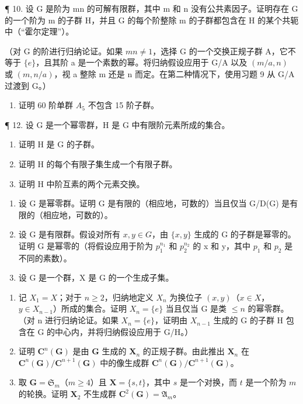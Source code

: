 ¶ 10. 设 G 是阶为 mn 的可解有限群，其中 m 和 n 没有公共素因子。证明存在 G 的一个阶为 m 的子群 H，并且 G 的每个阶整除 m 的子群都包含在 H 的某个共轭中（“霍尔定理”）。

（对 G 的阶进行归纳论证。如果 \(mn \neq 1\)，选择 G 的一个交换正规子群 A，它不等于 \(\{e\}\)，且其阶 a 是一个素数的幂。将归纳假设应用于 G/A 以及 \((m/a, n)\) 或 \((m, n/a)\)，视 a 整除 m 还是 n 而定。在第二种情况下，使用习题 9 从 G/A 过渡到 G。）

\begin{enumerate}
\def\labelenumi{\arabic{enumi}。}
\setcounter{enumi}{10}
\tightlist
\item
  证明 60 阶单群 \(A_{5}\) 不包含 15 阶子群。
\end{enumerate}

¶ 12. 设 G 是一个幂零群，H 是 G 中有限阶元素所成的集合。

\begin{enumerate}
\def\labelenumi{(\alph{enumi})}
\item
  证明 H 是 G 的子群。
\item
  证明 H 的每个有限子集生成一个有限子群。
\item
  证明 H 中阶互素的两个元素交换。
\end{enumerate}

\begin{enumerate}
\def\labelenumi{\arabic{enumi}。}
\setcounter{enumi}{12}
\item
  设 G 是幂零群。证明 G 是有限的（相应地，可数的）当且仅当 G/D(G) 是有限的（相应地，可数的）。
\item
  设 G 是有限群。假设对所有 \(x, y \in G\)，由 \(\{x, y\}\) 生成的 G 的子群是幂零的。证明 G 是幂零的（将假设应用于阶为 \(p_{1}^{n_{1}}\) 和 \(p_{2}^{n_{2}}\) 的 x 和 y，其中 \(p_{1}\) 和 \(p_{2}\) 是不同的素数）。
\item
  设 G 是一个群，X 是 G 的一个生成子集。
\end{enumerate}

\begin{enumerate}
\def\labelenumi{(\alph{enumi})}
\item
  记 \(X_{1} = X\)；对于 \(n \geqslant 2\)，归纳地定义 \(X_{n}\) 为换位子 \((x, y)\)（\(x \in X\)，\(y \in X_{n-1}\)）所成的集合。证明 \(X_{n} = \{e\}\) 当且仅当 G 是类 \(\leqslant n\) 的幂零群。（对 n 进行归纳论证。如果 \(X_{n} = \{e\}\)，证明由 \(X_{n-1}\) 生成的 G 的子群 H 包含在 G 的中心内，并将归纳假设应用于 G/H。）
\item
  证明 \(\mathbf{C}^n (\mathbf{G})\) 是由 \(\mathbf{G}\) 生成的 \(\mathbf{X}_n\) 的正规子群。由此推出 \(\mathbf{X}_n\) 在 \(\mathbf{C}^n (\mathbf{G}) / \mathbf{C}^{n + 1}(\mathbf{G})\) 中的像生成群 \(\mathbf{C}^n (\mathbf{G}) / \mathbf{C}^{n + 1}(\mathbf{G})\)。
\item
  取 \(\mathbf{G} = \mathfrak{S}_m\)（\(m \geqslant 4\)）且 \(\mathbf{X} = \{s, t\}\)，其中 \(s\) 是一个对换，而 \(t\) 是一个阶为 \(m\) 的轮换。证明 \(\mathbf{X}_2\) 不生成群 \(\mathbf{C}^2(\mathbf{G}) = \mathfrak{A}_m\)。
\end{enumerate}

